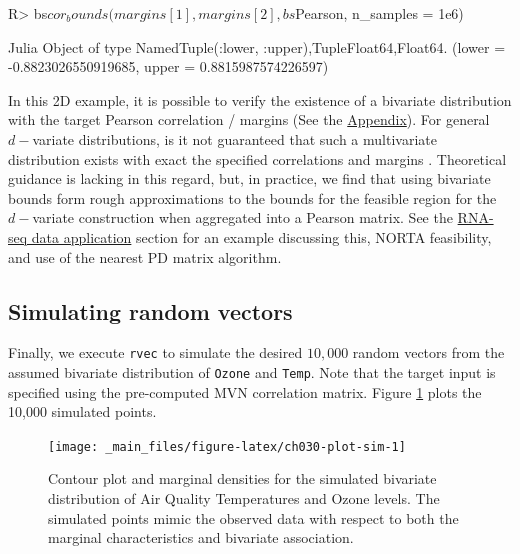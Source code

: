 \documentclass[
]{jss}
\begin{document}
\begin{CodeChunk}
\begin{CodeInput}
R> bs$cor_bounds(margins[1], margins[2], bs$Pearson, n_samples = 1e6)
\end{CodeInput}
\begin{CodeOutput}
Julia Object of type NamedTuple{(:lower, :upper),Tuple{Float64,Float64}}.
(lower = -0.8823026550919685, upper = 0.8815987574226597)
\end{CodeOutput}
\end{CodeChunk}

In this 2D example, it is possible to verify the existence of a bivariate distribution with the target Pearson correlation / margins (See the \protect\hyperlink{appendix}{Appendix}).
For general \(d-\)variate distributions, is it not guaranteed that such a multivariate distribution exists with exact the specified correlations and margins \citep{BF17}.
Theoretical guidance is lacking in this regard, but, in practice, we find that using bivariate bounds form rough approximations to the bounds for the feasible region for the \(d-\)variate construction when aggregated into a Pearson matrix.
See the \protect\hyperlink{examples}{RNA-seq data application} section for an example discussing this, NORTA feasibility, and use of the nearest PD matrix algorithm.

\hypertarget{simulating-random-vectors}{%
\subsection{Simulating random vectors}\label{simulating-random-vectors}}

Finally, we execute \texttt{rvec} to simulate the desired \(10,000\) random vectors from the assumed bivariate distribution of \texttt{Ozone} and \texttt{Temp}. Note that the target input is specified using the pre-computed MVN correlation matrix. Figure \ref{fig:ch030-plot-sim} plots the 10,000 simulated points.

\begin{CodeChunk}
\end{CodeChunk}

\begin{CodeChunk}
\begin{figure}

{\centering \texttt{[image: \_main\_files/figure-latex/ch030-plot-sim-1]} 

}

\caption[Contour plot and marginal densities for the simulated bivariate distribution of Air Quality Temperatures and Ozone levels]{Contour plot and marginal densities for the simulated bivariate distribution of Air Quality Temperatures and Ozone levels. The simulated points mimic the observed data with respect to both the marginal characteristics and bivariate association.}\label{fig:ch030-plot-sim}
\end{figure}
\end{CodeChunk}
\end{document}

